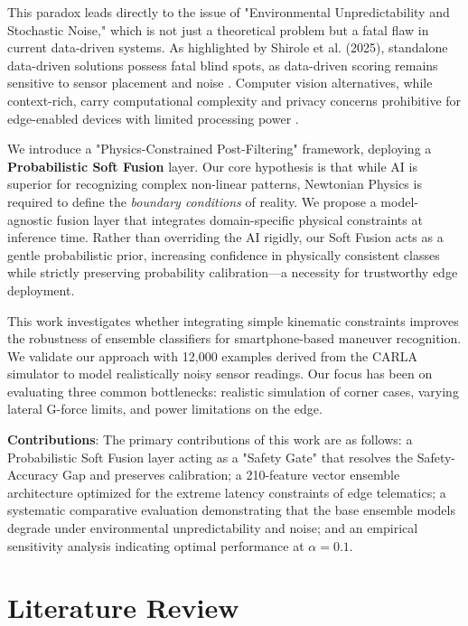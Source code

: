 \documentclass[pdflatex,sn-mathphys-num]{sn-jnl}
\theoremstyle{thmstyleone}
\theoremstyle{thmstyletwo}
\theoremstyle{thmstylethree}
\begin{document}
This paradox leads directly to the issue of "Environmental Unpredictability and Stochastic Noise," which is not just a theoretical problem but a fatal flaw in current data-driven systems. As highlighted by Shirole et al. (2025), standalone data-driven solutions possess fatal blind spots, as data-driven scoring remains sensitive to sensor placement and noise \cite{shirole2025}. Computer vision alternatives, while context-rich, carry computational complexity and privacy concerns prohibitive for edge-enabled devices with limited processing power \cite{qu2024}.

We introduce a "Physics-Constrained Post-Filtering" framework, deploying a \textbf{Probabilistic Soft Fusion} layer. Our core hypothesis is that while AI is superior for recognizing complex non-linear patterns, Newtonian Physics is required to define the \textit{boundary conditions} of reality. We propose a model-agnostic fusion layer that integrates domain-specific physical constraints at inference time. Rather than overriding the AI rigidly, our Soft Fusion acts as a gentle probabilistic prior, increasing confidence in physically consistent classes while strictly preserving probability calibration---a necessity for trustworthy edge deployment.

This work investigates whether integrating simple kinematic constraints improves the robustness of ensemble classifiers for smartphone-based maneuver recognition. We validate our approach with 12,000 examples derived from the CARLA simulator to model realistically noisy sensor readings. Our focus has been on evaluating three common bottlenecks: realistic simulation of corner cases, varying lateral G-force limits, and power limitations on the edge.

\textbf{Contributions}: The primary contributions of this work are as follows: a Probabilistic Soft Fusion layer acting as a "Safety Gate" that resolves the Safety-Accuracy Gap and preserves calibration; a 210-feature vector ensemble architecture optimized for the extreme latency constraints of edge telematics; a systematic comparative evaluation demonstrating that the base ensemble models degrade under environmental unpredictability and noise; and an empirical sensitivity analysis indicating optimal performance at $\alpha=0.1$.

\FloatBarrier
\section{Literature Review}\label{sec:related}
\end{document}
